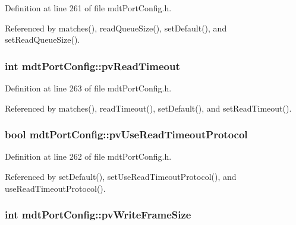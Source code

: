 Definition at line 261 of file mdt\-Port\-Config.\-h.



Referenced by matches(), read\-Queue\-Size(), set\-Default(), and set\-Read\-Queue\-Size().

\hypertarget{classmdt_port_config_a69fa9f6cb32469f3eccfe7517dc29101}{
\subsubsection[{pv\-Read\-Timeout}]{\setlength{\rightskip}{0pt plus 5cm}int mdt\-Port\-Config\-::pv\-Read\-Timeout\hspace{0.3cm}{\ttfamily [protected]}}}\label{classmdt_port_config_a69fa9f6cb32469f3eccfe7517dc29101}


Definition at line 263 of file mdt\-Port\-Config.\-h.



Referenced by matches(), read\-Timeout(), set\-Default(), and set\-Read\-Timeout().

\hypertarget{classmdt_port_config_a1a5ab2cf82ea35db627aa8b87f9dba2e}{
\subsubsection[{pv\-Use\-Read\-Timeout\-Protocol}]{\setlength{\rightskip}{0pt plus 5cm}bool mdt\-Port\-Config\-::pv\-Use\-Read\-Timeout\-Protocol\hspace{0.3cm}{\ttfamily [protected]}}}\label{classmdt_port_config_a1a5ab2cf82ea35db627aa8b87f9dba2e}


Definition at line 262 of file mdt\-Port\-Config.\-h.



Referenced by set\-Default(), set\-Use\-Read\-Timeout\-Protocol(), and use\-Read\-Timeout\-Protocol().

\hypertarget{classmdt_port_config_aeaeb93ea4d49f66ff9613c7499e670f4}{
\subsubsection[{pv\-Write\-Frame\-Size}]{\setlength{\rightskip}{0pt plus 5cm}int mdt\-Port\-Config\-::pv\-Write\-Frame\-Size\hspace{0.3cm}{\ttfamily [protected]}}}\label{classmdt_port_config_aeaeb93ea4d49f66ff9613c7499e670f4}



